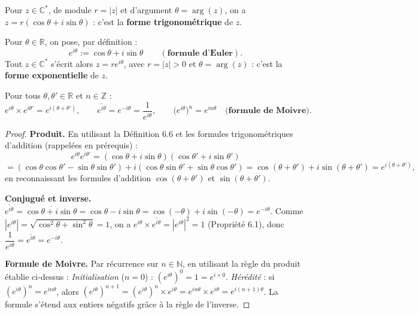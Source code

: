 \documentclass[a4paper,12pt,openany]{book}
\begin{document}
\begin{definition}[6.5]
Pour $z\in\mathbb{C}^*$, de module $r=|z|$ et d'argument $\theta=\arg(z)$,
on a $z = r(\cos\theta+i\sin\theta)$ : c'est la \textbf{forme
trigonométrique} de $z$.
\end{definition}

\begin{definition}
Pour $\theta\in\mathbb{R}$, on pose, par définition :
\[
e^{i\theta} := \cos\theta + i\sin\theta \qquad (\textbf{formule d'Euler}).
\]
Tout $z\in\mathbb{C}^*$ s'écrit alors $z=re^{i\theta}$, avec $r=|z|>0$ et
$\theta=\arg(z)$ : c'est la \textbf{forme exponentielle} de $z$.
\end{definition}

\begin{theoreme}
Pour tous $\theta,\theta'\in\mathbb{R}$ et $n\in\mathbb{Z}$ :
\[
e^{i\theta}\times e^{i\theta'} = e^{i(\theta+\theta')}, \qquad
\overline{e^{i\theta}} = e^{-i\theta} = \frac{1}{e^{i\theta}}, \qquad
\big(e^{i\theta}\big)^n = e^{in\theta} \quad \textbf{(formule de Moivre)}.
\]
\end{theoreme}

\begin{proof}
\textbf{Produit.} En utilisant la Définition 6.6 et les formules
trigonométriques d'addition (rappelées en prérequis) :
\[
e^{i\theta}e^{i\theta'} = (\cos\theta+i\sin\theta)(\cos\theta'+i\sin\theta')
\]
\[
= (\cos\theta\cos\theta'-\sin\theta\sin\theta') +
i(\cos\theta\sin\theta'+\sin\theta\cos\theta')
= \cos(\theta+\theta') + i\sin(\theta+\theta') = e^{i(\theta+\theta')},
\]
en reconnaissant les formules d'addition $\cos(\theta+\theta')$ et
$\sin(\theta+\theta')$.

\textbf{Conjugué et inverse.} $\overline{e^{i\theta}} =
\overline{\cos\theta+i\sin\theta} = \cos\theta-i\sin\theta =
\cos(-\theta)+i\sin(-\theta) = e^{-i\theta}$. Comme
$|e^{i\theta}|=\sqrt{\cos^2\theta+\sin^2\theta}=1$, on a
$e^{i\theta}\times\overline{e^{i\theta}} = |e^{i\theta}|^2 = 1$
(Propriété 6.1), donc $\dfrac{1}{e^{i\theta}} = \overline{e^{i\theta}} =
e^{-i\theta}$.

\textbf{Formule de Moivre.} Par récurrence sur $n\in\mathbb{N}$, en
utilisant la règle du produit établie ci-dessus :
\emph{Initialisation} ($n=0$) : $(e^{i\theta})^0=1=e^{i\times0}$.
\emph{Hérédité} : si $(e^{i\theta})^n=e^{in\theta}$, alors
$(e^{i\theta})^{n+1} = (e^{i\theta})^n \times e^{i\theta} = e^{in\theta}
\times e^{i\theta} = e^{i(n+1)\theta}$. La formule s'étend aux entiers
négatifs grâce à la règle de l'inverse.
\end{proof}
\end{document}
